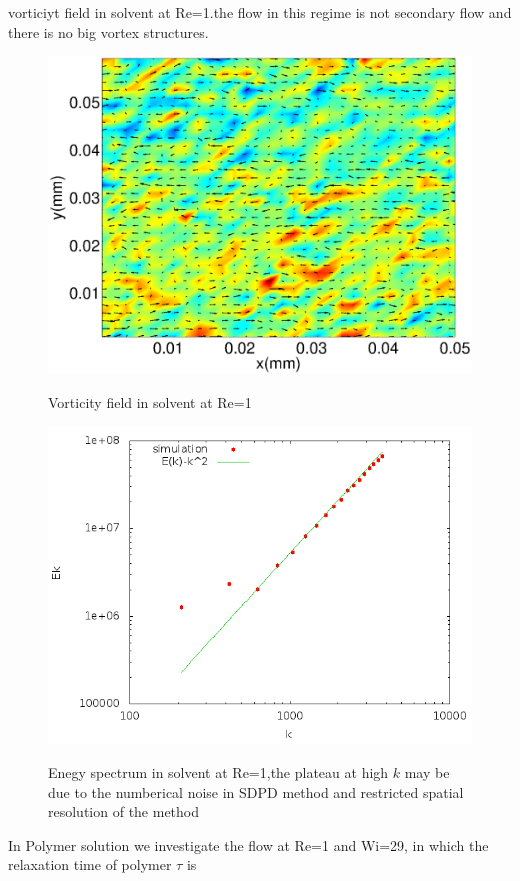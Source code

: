 \documentclass[aps,pre,twocolumn,showpacs,superscriptaddress,groupedaddress]{revtex4}  %
\begin{document}
vorticiyt field in solvent at Re=1.the flow in this regime is not secondary flow and there is no big vortex structures.\\
\begin{figure}
 \includegraphics[scale=0.35]{img/vorsols}
\label{fig:vorsols}
\caption{Vorticity field in solvent at Re=1}
\end{figure} 
\begin{figure}
 \includegraphics[scale=0.5]{img/spesols}
\label{fig:spesols}
\caption{Enegy spectrum in solvent at Re=1,the plateau at high $k$ may be due to the numberical noise in SDPD method and restricted spatial resolution of the method}
\end{figure} 
In Polymer solution we investigate the flow at Re=1 and Wi=29, in which the relaxation time of polymer $\tau$ is 
\end{document}
